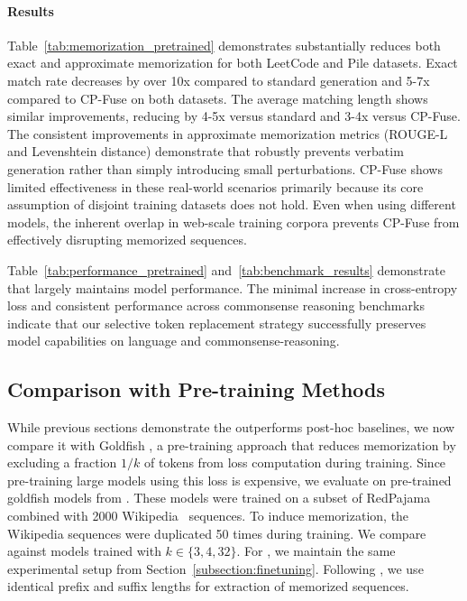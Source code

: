 \paragraph{Results} Table~\ref{tab:memorization_pretrained} demonstrates \sys substantially reduces both exact and approximate memorization for both LeetCode and Pile datasets. Exact match rate decreases by over 10x compared to standard generation and 5-7x compared to CP-Fuse on both datasets. The average matching length shows similar improvements, reducing by 4-5x versus standard and 3-4x versus CP-Fuse. The consistent improvements in approximate memorization metrics (ROUGE-L and Levenshtein distance) demonstrate that \sys robustly prevents verbatim generation rather than simply introducing small perturbations. CP-Fuse shows limited effectiveness in these real-world scenarios primarily because its core assumption of disjoint training datasets does not hold. Even when using different models, the inherent overlap in web-scale training corpora prevents CP-Fuse from effectively disrupting memorized sequences. 

Table~\ref{tab:performance_pretrained} and~\ref{tab:benchmark_results} demonstrate that \sys largely maintains model performance. The minimal increase in cross-entropy loss and consistent performance across commonsense reasoning benchmarks indicate that our selective token replacement strategy successfully preserves model capabilities on language and commonsense-reasoning. 

\subsection{Comparison with Pre-training Methods}
\label{subsection:goldfish}

While previous sections demonstrate the \sys outperforms post-hoc baselines, we now compare it with Goldfish \citep{hans2024like}, a pre-training approach that reduces memorization by excluding a fraction $1/k$ of tokens from loss computation during training. Since pre-training large models using this loss is expensive, we evaluate on pre-trained goldfish models from \citet{hans2024like}. These models were trained on a subset of RedPajama~\citep{weber2024redpajama} combined with 2000 Wikipedia~\citep{bridge2001wikipedia} sequences. To induce memorization, the Wikipedia sequences were duplicated 50 times during training. We compare against models trained with $k \in \{3,4,32\}$. For \sys, we maintain the same experimental setup from Section~\ref{subsection:finetuning}. Following \citet{hans2024like}, we use identical prefix and suffix lengths for extraction of memorized sequences.

